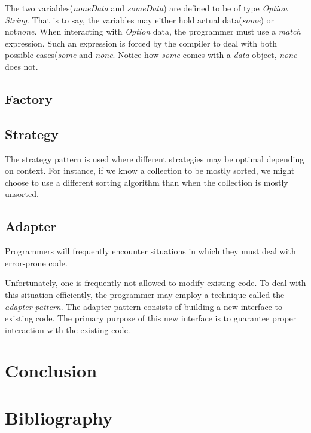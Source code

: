 \documentclass{article}
\begin{document}
\begin{lstlisting}[language=Python]
\end{lstlisting}

The two variables({\em noneData} and {\em someData}) are defined to be of type {\em Option String}.
That is to say, the variables may either hold actual data({\em some}) or not{\em none}.
When interacting with {\em Option} data, the programmer must use a {\em match} expression.
Such an expression is forced by the compiler to deal with both possible cases({\em some} and {\em none}.
Notice how {\em some} comes with a {\em data} object, {\em none} does not.

\subsection{Factory}
\subsection{Strategy}
The strategy pattern is used where different strategies may be optimal depending on context.
For instance, if we know a collection to be mostly sorted, we might choose to use a different sorting algorithm than when the collection is mostly unsorted.


\subsection{Adapter}
Programmers will frequently encounter situations in which they must deal with error-prone code.

Unfortunately, one is frequently not allowed to modify existing code.
To deal with this situation efficiently, the programmer may employ a technique called the {\em adapter pattern}.
The adapter pattern consists of building a new interface to existing code.
The primary purpose of this new interface is to guarantee proper interaction with the existing code.

\newpage

\section{Conclusion}


\section{Bibliography}


\fi
\end{document}
